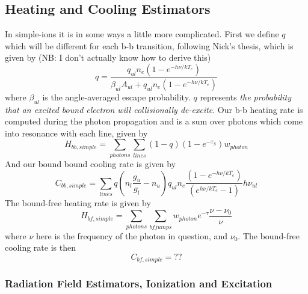 \subsection{Heating and Cooling Estimators}
In simple-ions it is in some ways a little more complicated. 
First we define $q$ which will be different for each b-b transition, 
following Nick's thesis, which is given by 
(NB: I don't actually know how to derive this)
\begin{equation}
q = \frac{q_{ul} n_e (1 - e^{-h\nu/kT_e})}{\beta_{ul} A_{ul} + q_{ul} n_e (1 - e^{-h\nu/kT_e})}
\end{equation}
where $\beta_{ul}$ is the angle-averaged escape probability. 
$q$ represents {\em the probability that an excited bound electron
will collisionally de-excite}.
Our b-b heating rate is computed during the photon propagation and is a sum
over photons which come into resonance with each line, given by 
\begin{equation}
H_{bb,simple} = \sum_{photons} \sum_{lines} (1 - q) (1 - e^{-\tau_S}) w_{photon}
\end{equation}
And our bound bound cooling rate is given by 
\begin{equation}
C_{bb,simple} = \sum_{lines} q \left(n_l\frac{g_u}{g_l} - n_u\right) q_{ul} n_e 
\frac{(1 - e^{-h\nu/kT_e})}{(e^{h\nu/kT_e} - 1)}  h \nu_{ul}
\end{equation}
\noindent
The bound-free heating rate is given by
\begin{equation}
H_{bf,simple} = \sum_{photons} \sum_{bfjumps} w_{photon} e^{-\tau} \frac{\nu - \nu_{0}}{\nu}
\end{equation}
where $\nu$ here is the frequency of the photon in question, and $\nu_{0}$.
The bound-free cooling rate is then
\begin{equation}
C_{bf,simple} = ??
\end{equation}

\subsubsection{Radiation Field Estimators, Ionization and Excitation}

